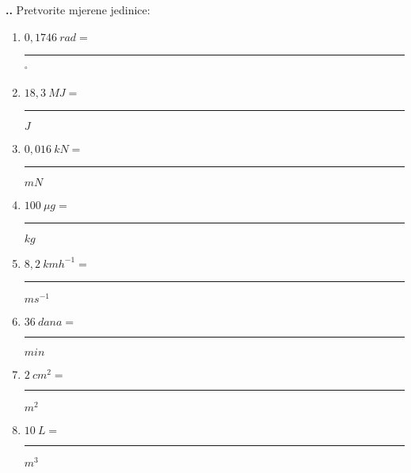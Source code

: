 
\noindent 
\textbf{
\thecjelina.\thezadatak.}
Pretvorite mjerene jedinice:
\begin{enumerate}[label=\alph*)]
  \item $0,1746\ rad=$ \rule{3cm}{0.5pt} $ ^\circ $
  \item $18,3\ MJ =$ \rule{3cm}{0.5pt} $ J$
  \item $0,016\ kN =$ \rule{3cm}{0.5pt} $ mN$  
  \item $100\ \mu g= $ \rule{3cm}{0.5pt} $ kg$
  \item $8,2\ kmh^{-1} =$ \rule{3cm}{0.5pt} $ms^{-1}$
  \item $36\ dana =$ \rule{3cm}{0.5pt} $min $
  \item $2\ cm^2=$ \rule{3cm}{0.5pt} $m^2 $
  \item $10\ L =$ \rule{3cm}{0.5pt} $m^3$
\end{enumerate}


